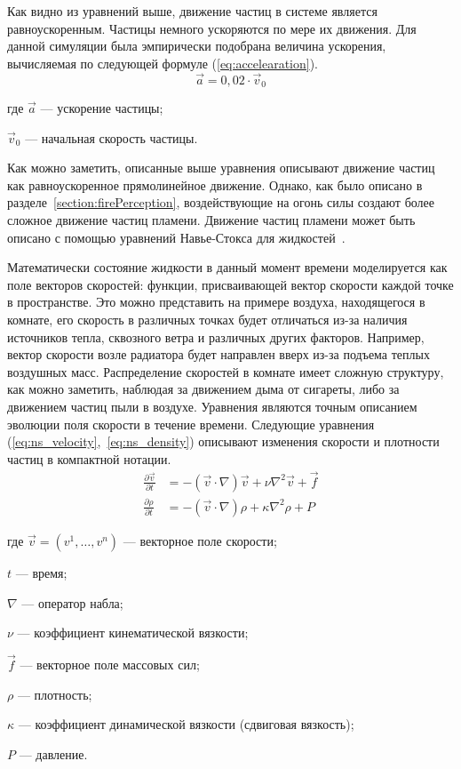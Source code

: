 Как видно из уравнений выше, движение частиц в системе является равноускоренным.
Частицы немного ускоряются по мере их движения. Для данной симуляции была
эмпирически подобрана величина ускорения, вычисляемая по следующей формуле
(\ref{eq:accelearation}).
\begin{equation}
  \label{eq:accelearation}
  \vec{a} = 0,02 \cdot \vec{v}_{0}
\end{equation}
\begin{explanationx}
    \item [где] $\vec{a}$ --- ускорение частицы;
    \item $\vec{v}_{0}$ --- начальная скорость частицы.
\end{explanationx}

Как можно заметить, описанные выше уравнения описывают движение частиц как
равноускоренное прямолинейное движение. Однако, как было описано в
разделе~\ref{section:firePerception}, воздействующие на огонь силы создают более
сложное движение частиц пламени. Движение частиц пламени может быть описано с
помощью уравнений Навье-Стокса для жидкостей~\cite{ForGames}.

Математически состояние жидкости в данный момент времени моделируется как поле
векторов скоростей: функции, присваивающей вектор скорости каждой точке в
пространстве. Это можно представить на примере воздуха, находящегося в комнате,
его скорость в различных точках будет отличаться из-за наличия источников тепла,
сквозного ветра и различных других факторов. Например, вектор скорости возле
радиатора будет направлен вверх из-за подъема теплых воздушных масс.
Распределение скоростей в комнате имеет сложную структуру, как можно заметить,
наблюдая за движением дыма от сигареты, либо за движением частиц пыли в воздухе.
Уравнения являются точным описанием эволюции поля скорости в течение времени.
Следующие уравнения (\ref{eq:ns_velocity},~\ref{eq:ns_density}) описывают
изменения скорости и плотности частиц в компактной нотации.
\begin{align}
    \label{eq:ns_velocity}
    \frac{\partial{\vec{v}}}{\partial{t}} &= -(\vec{v} \cdot \nabla)\vec{v} + \nu \nabla ^ 2 \vec{v} + \vec{f} \\
    \label{eq:ns_density}
    \frac{\partial{\rho}}{\partial{t}} &= -(\vec{v} \cdot \nabla)\rho + \kappa \nabla ^ 2 \rho + P
\end{align}
\begin{explanationx}
    \item [где] $\vec{v} = (v ^ 1, \ldots, v ^ n)$ --- векторное поле скорости;
    \item $t$ --- время;
    \item $\nabla$ --- оператор набла;
    \item $\nu$ --- коэффициент кинематической вязкости;
    \item $\vec{f}$ --- векторное поле массовых сил;
    \item $\rho$ --- плотность;
    \item $\kappa$ --- коэффициент динамической вязкости (сдвиговая вязкость);
    \item $P$ --- давление.
\end{explanationx}

